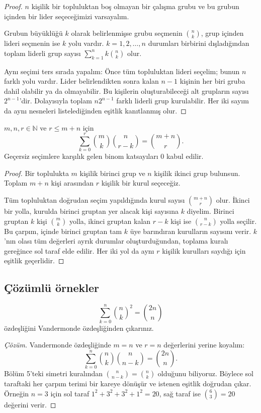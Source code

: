 \begin{proof}
$n$ kişilik bir topluluktan boş olmayan bir çalışma grubu ve bu grubun içinden bir lider seçeceğimizi varsayalım.

Grubun büyüklüğü $k$ olarak belirlenmişse grubu seçmenin $\binom{n}{k}$, grup içinden lideri seçmenin ise $k$ yolu vardır. $k=1,2,\ldots,n$ durumları birbirini dışladığından toplam liderli grup sayısı $\sum_{k=1}^{n}k\binom{n}{k}$ olur.

Aynı seçimi ters sırada yapalım: Önce tüm topluluktan lideri seçelim; bunun $n$ farklı yolu vardır. Lider belirlendikten sonra kalan $n-1$ kişinin her biri gruba dahil olabilir ya da olmayabilir. Bu kişilerin oluşturabileceği alt grupların sayısı $2^{n-1}$'dir. Dolayısıyla toplam $n2^{n-1}$ farklı liderli grup kurulabilir. Her iki sayım da aynı nesneleri listelediğinden eşitlik kanıtlanmış olur.
\end{proof}

\begin{theorem}
$m,n,r\in\mathbb{N}$ ve $r\le m+n$ için
\[
\sum_{k=0}^{r}\binom{m}{k}\binom{n}{r-k}=\binom{m+n}{r}.
\]
Geçersiz seçimlere karşılık gelen binom katsayıları $0$ kabul edilir.
\end{theorem}

\begin{proof}
Bir toplulukta $m$ kişilik birinci grup ve $n$ kişilik ikinci grup bulunsun. Toplam $m+n$ kişi arasından $r$ kişilik bir kurul seçeceğiz.

Tüm topluluktan doğrudan seçim yapıldığında kurul sayısı $\binom{m+n}{r}$ olur. İkinci bir yolla, kurulda birinci gruptan yer alacak kişi sayısına $k$ diyelim. Birinci gruptan $k$ kişi $\binom{m}{k}$ yolla, ikinci gruptan kalan $r-k$ kişi ise $\binom{n}{r-k}$ yolla seçilir. Bu çarpım, içinde birinci gruptan tam $k$ üye barındıran kurulların sayısını verir. $k$'nın olası tüm değerleri ayrık durumlar oluşturduğundan, toplama kuralı gereğince sol taraf elde edilir. Her iki yol da aynı $r$ kişilik kurulları saydığı için eşitlik geçerlidir.
\end{proof}

\subsection{Çözümlü örnekler}

\begin{example}
\[
\sum_{k=0}^{n}\binom{n}{k}^2=\binom{2n}{n}
\]
özdeşliğini Vandermonde özdeşliğinden çıkarınız.
\end{example}
\begin{proof}[Çözüm]
Vandermonde özdeşliğinde $m=n$ ve $r=n$ değerlerini yerine koyalım:
\[
\sum_{k=0}^{n}\binom{n}{k}\binom{n}{n-k}=\binom{2n}{n}.
\]
Bölüm 5'teki simetri kuralından $\binom{n}{n-k}=\binom{n}{k}$ olduğunu biliyoruz. Böylece sol taraftaki her çarpım terimi bir kareye dönüşür ve istenen eşitlik doğrudan çıkar. Örneğin $n=3$ için sol taraf $1^2+3^2+3^2+1^2=20$, sağ taraf ise $\binom63=20$ değerini verir.
\end{proof}

